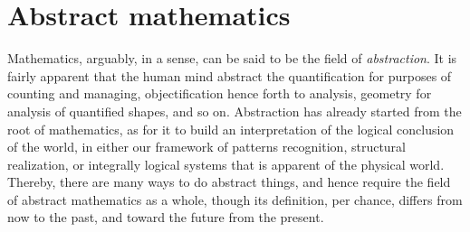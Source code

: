 \chapter{Abstract mathematics}

Mathematics, arguably, in a sense, can be said to be the field of \textit{abstraction}. It is fairly apparent that the human mind abstract the quantification for purposes of counting and managing, objectification hence forth to analysis, geometry for analysis of quantified shapes, and so on. Abstraction has already started from the root of mathematics, as for it to build an interpretation of the logical conclusion of the world, in either our framework of patterns recognition, structural realization, or integrally logical systems that is apparent of the physical world. Thereby, there are many ways to do abstract things, and hence require the field of abstract mathematics as a whole, though its definition, per chance, differs from now to the past, and toward the future from the present. 

